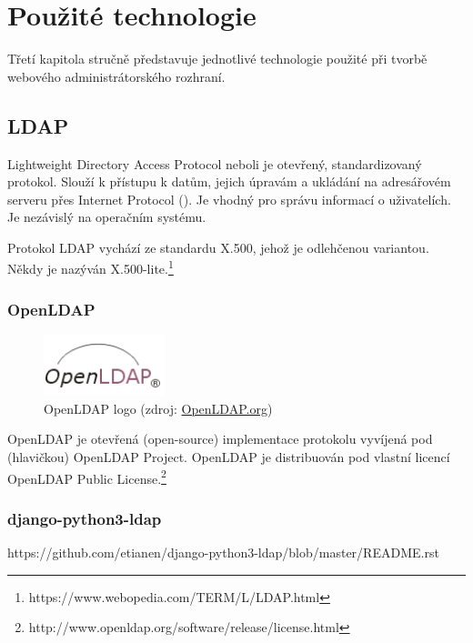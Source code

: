 \chapter{Použité technologie}
\label{3-technologie}

Třetí kapitola stručně představuje jednotlivé technologie použité při
tvorbě webového administrátorského rozhraní.

\section{LDAP}

Lightweight Directory Access Protocol neboli  je otevřený, standardizovaný protokol. Slouží k přístupu k datům, jejich úpravám a ukládání na adresářovém serveru přes Internet Protocol (). Je vhodný pro správu informací o uživatelích. Je nezávislý na operačním systému.

Protokol LDAP vychází ze standardu X.500, jehož je odlehčenou variantou. Někdy je nazýván X.500-lite.\footnote{https://www.webopedia.com/TERM/L/LDAP.html}

\subsection{OpenLDAP}
\label{openldap}

\begin{figure}[H] \centering
      \includegraphics[width=100pt]{./pictures/LDAPlogo.png}
      \caption[OpenLDAP logo]{OpenLDAP logo (zdroj:
\href{http://www.openldap.org/images/headers/LDAPlogo.gif}{OpenLDAP.org})}
      \label{fig:ldap}
  \end{figure}

OpenLDAP je otevřená (open-source) implementace protokolu  vyvíjená pod (hlavičkou) OpenLDAP Project. OpenLDAP je distribuován pod vlastní licencí OpenLDAP Public License.\footnote{http://www.openldap.org/software/release/license.html}

\subsection{django-python3-ldap}
https://github.com/etianen/django-python3-ldap/blob/master/README.rst

